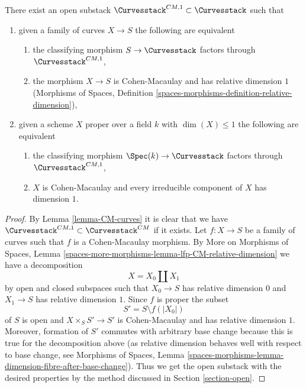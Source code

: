\begin{lemma}
\label{lemma-CM-1-curves}
There exist an open substack $\Curvesstack^{CM, 1} \subset \Curvesstack$
such that
\begin{enumerate}
\item given a family of curves $X \to S$ the following are equivalent
\begin{enumerate}
\item the classifying morphism $S \to \Curvesstack$ factors
through $\Curvesstack^{CM, 1}$,
\item the morphism $X \to S$ is Cohen-Macaulay and has
relative dimension $1$ (Morphisms of Spaces, Definition
\ref{spaces-morphisms-definition-relative-dimension}),
\end{enumerate}
\item given a scheme $X$ proper over a field $k$ with $\dim(X) \leq 1$
the following are equivalent
\begin{enumerate}
\item the classifying morphism $\Spec(k) \to \Curvesstack$ factors
through $\Curvesstack^{CM, 1}$,
\item $X$ is Cohen-Macaulay and every irreducible component of $X$
has dimension $1$.
\end{enumerate}
\end{enumerate}
\end{lemma}

\begin{proof}
By Lemma \ref{lemma-CM-curves} it is clear that we have
$\Curvesstack^{CM, 1} \subset \Curvesstack^{CM}$
if it exists. Let $f : X \to S$ be a family of curves
such that $f$ is a Cohen-Macaulay morphism. By
More on Morphisms of Spaces, Lemma
\ref{spaces-more-morphisms-lemma-lfp-CM-relative-dimension}
we have a decomposition
$$
X = X_0 \amalg X_1
$$
by open and closed subspaces such that $X_0 \to S$ has relative
dimension $0$ and $X_1 \to S$ has relative dimension $1$.
Since $f$ is proper the subset
$$
S' = S \setminus f(|X_0|)
$$
of $S$ is open and $X \times_S S' \to S'$ is Cohen-Macaulay
and has relative dimension $1$.
Moreover, formation of $S'$ commutes with arbitrary base
change because this is true for the decomposition above
(as relative dimension behaves well with respect to base
change, see Morphisms of Spaces, Lemma
\ref{spaces-morphisms-lemma-dimension-fibre-after-base-change}).
Thus we get the open substack with the desired properties
by the method discussed in Section \ref{section-open}.
\end{proof}







